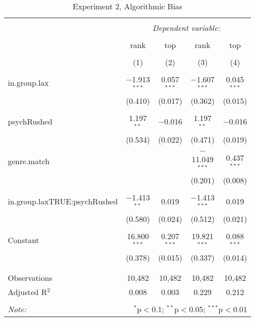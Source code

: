 
\begin{table}[!htbp] \centering 
  \caption{Experiment 2, Algorithmic Bias} 
  \label{} 
\begin{tabular}{@{\extracolsep{5pt}}lcccc} 
\\[-1.8ex]\hline 
\hline \\[-1.8ex] 
 & \multicolumn{4}{c}{\textit{Dependent variable:}} \\ 
\cline{2-5} 
\\[-1.8ex] & rank & top & rank & top \\ 
\\[-1.8ex] & (1) & (2) & (3) & (4)\\ 
\hline \\[-1.8ex] 
 in.group.lax & $-$1.913$^{***}$ & 0.057$^{***}$ & $-$1.607$^{***}$ & 0.045$^{***}$ \\ 
  & (0.410) & (0.017) & (0.362) & (0.015) \\ 
  & & & & \\ 
 psychRushed & 1.197$^{**}$ & $-$0.016 & 1.197$^{**}$ & $-$0.016 \\ 
  & (0.534) & (0.022) & (0.471) & (0.019) \\ 
  & & & & \\ 
 genre.match &  &  & $-$11.049$^{***}$ & 0.437$^{***}$ \\ 
  &  &  & (0.201) & (0.008) \\ 
  & & & & \\ 
 in.group.laxTRUE:psychRushed & $-$1.413$^{**}$ & 0.019 & $-$1.413$^{***}$ & 0.019 \\ 
  & (0.580) & (0.024) & (0.512) & (0.021) \\ 
  & & & & \\ 
 Constant & 16.800$^{***}$ & 0.207$^{***}$ & 19.821$^{***}$ & 0.088$^{***}$ \\ 
  & (0.378) & (0.015) & (0.337) & (0.014) \\ 
  & & & & \\ 
\hline \\[-1.8ex] 
Observations & 10,482 & 10,482 & 10,482 & 10,482 \\ 
Adjusted R$^{2}$ & 0.008 & 0.003 & 0.229 & 0.212 \\ 
\hline 
\hline \\[-1.8ex] 
\textit{Note:}  & \multicolumn{4}{r}{$^{*}$p$<$0.1; $^{**}$p$<$0.05; $^{***}$p$<$0.01} \\ 
\end{tabular} 
\end{table} 
